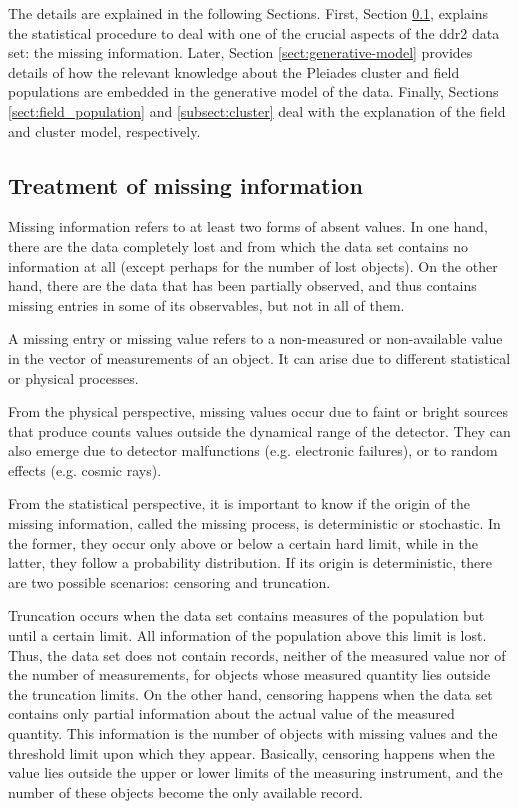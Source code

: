 The details are explained in the following Sections. First, Section \ref{sect:missing}, explains the statistical procedure to deal with one of the crucial aspects of the \gls{ddr2} data set: the missing information. Later, Section \ref{sect:generative-model} provides details of how the relevant knowledge about the Pleiades cluster and field populations are embedded in the generative model of the data. Finally, Sections \ref{sect:field_population} and \ref{subsect:cluster} deal with the explanation of the field and cluster model, respectively.

\subsection{Treatment of missing information}
\label{sect:missing}

Missing information refers to at least two forms of absent values. In one hand, there are the data completely lost and from which the data set contains no information at all (except perhaps for the number of lost objects). On the other hand, there are the data that has been partially observed, and thus contains missing entries in some of its observables, but not in all of them.

A missing entry or missing value refers to a non-measured or non-available value in the vector of measurements of an object. It can arise due to different statistical or physical processes. 

From the physical perspective, missing values occur due to faint or bright sources that produce counts values outside the dynamical range of the detector. They can also emerge due to detector malfunctions (e.g. electronic failures), or to random effects (e.g. cosmic rays).

From the statistical perspective, it is important to know if the origin of the missing information, called the missing process, is deterministic or stochastic. In the former, they occur only above or below a certain hard limit, while in the latter, they follow a probability distribution. If its origin is deterministic, there are two possible scenarios: censoring and truncation. 

Truncation occurs when the data set contains measures of the population but until a certain limit. All information of the population above this limit is lost. Thus, the data set does not contain records, neither of the measured value nor of the number of measurements, for objects whose measured quantity lies outside the truncation limits.  On the other hand, censoring happens when the data set contains only partial information about the actual value of the measured quantity. This information is the number of objects with missing values and the threshold limit upon which they appear. Basically, censoring happens when the value lies outside the upper or lower limits of the measuring instrument, and the number of these objects become the only available record.

